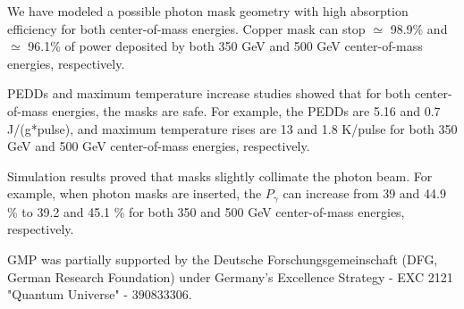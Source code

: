 \documentclass[a4paper]{article}
\begin{document}
We have modeled a possible photon mask geometry with high absorption efficiency for both center-of-mass energies. Copper mask can stop $\simeq$ 98.9\% and $\simeq$ 96.1\% of power deposited by both 350 GeV and 500 GeV center-of-mass energies, respectively.


PEDDs and maximum temperature increase studies showed that for both center-of-mass energies, the masks are safe. For example, the PEDDs are 5.16 and 0.7 J/(g*pulse), and maximum temperature rises are 13 and 1.8 K/pulse for both 350 GeV and 500 GeV center-of-mass energies, respectively.


Simulation results proved that masks slightly collimate the photon beam. For example, when photon masks are inserted, the $P_\gamma$ can increase from 39 and 44.9 \% to 39.2 and 45.1 \% for both 350 and 500 GeV center-of-mass energies, respectively.

\newpage
\begin{description}
\fontsize{13}{13}\selectfont
\item[$\bullet$ Acknowledgments]
\end{description}
\fontsize{12}{13}\selectfont
GMP was partially supported by the Deutsche Forschungsgemeinschaft (DFG, German Research Foundation) under Germany's Excellence Strategy -  EXC 2121 "Quantum Universe" - 390833306.





%

\end{document}
